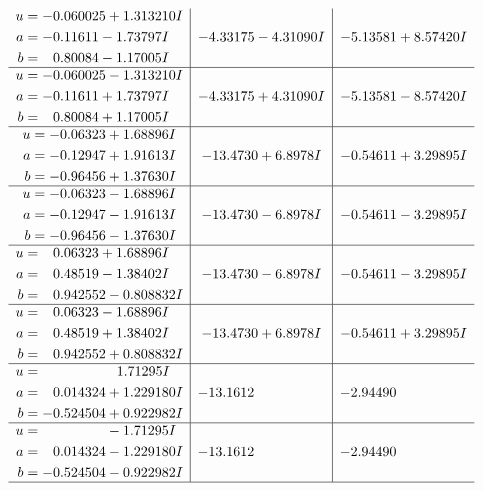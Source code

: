 \documentclass[1p]{elsarticle_modified}
\theoremstyle{definition}
\begin{document}
$$\begin{array}{c|c|c}
\begin{aligned}
u &= -0.060025 + 1.313210 I \\
a &= -0.11611 - 1.73797 I \\
b &= \phantom{-}0.80084 - 1.17005 I\end{aligned}
 & -4.33175 - 4.31090 I & -5.13581 + 8.57420 I \\ \hline\begin{aligned}
u &= -0.060025 - 1.313210 I \\
a &= -0.11611 + 1.73797 I \\
b &= \phantom{-}0.80084 + 1.17005 I\end{aligned}
 & -4.33175 + 4.31090 I & -5.13581 - 8.57420 I \\ \hline\begin{aligned}
u &= -0.06323 + 1.68896 I \\
a &= -0.12947 + 1.91613 I \\
b &= -0.96456 + 1.37630 I\end{aligned}
 & -13.4730 + 6.8978 I & -0.54611 + 3.29895 I \\ \hline\begin{aligned}
u &= -0.06323 - 1.68896 I \\
a &= -0.12947 - 1.91613 I \\
b &= -0.96456 - 1.37630 I\end{aligned}
 & -13.4730 - 6.8978 I & -0.54611 - 3.29895 I \\ \hline\begin{aligned}
u &= \phantom{-}0.06323 + 1.68896 I \\
a &= \phantom{-}0.48519 - 1.38402 I \\
b &= \phantom{-}0.942552 - 0.808832 I\end{aligned}
 & -13.4730 - 6.8978 I & -0.54611 - 3.29895 I \\ \hline\begin{aligned}
u &= \phantom{-}0.06323 - 1.68896 I \\
a &= \phantom{-}0.48519 + 1.38402 I \\
b &= \phantom{-}0.942552 + 0.808832 I\end{aligned}
 & -13.4730 + 6.8978 I & -0.54611 + 3.29895 I \\ \hline\begin{aligned}
u &= \phantom{-0.000000 -}1.71295 I \\
a &= \phantom{-}0.014324 + 1.229180 I \\
b &= -0.524504 + 0.922982 I\end{aligned}
 & -13.1612\phantom{ +0.000000I} & -2.94490\phantom{ +0.000000I} \\ \hline\begin{aligned}
u &= \phantom{-0.000000 } -1.71295 I \\
a &= \phantom{-}0.014324 - 1.229180 I \\
b &= -0.524504 - 0.922982 I\end{aligned}
 & -13.1612\phantom{ +0.000000I} & -2.94490\phantom{ +0.000000I}\\
 \hline 
 \end{array}$$\newpage\newpage\renewcommand{\arraystretch}{1}
\end{document}
